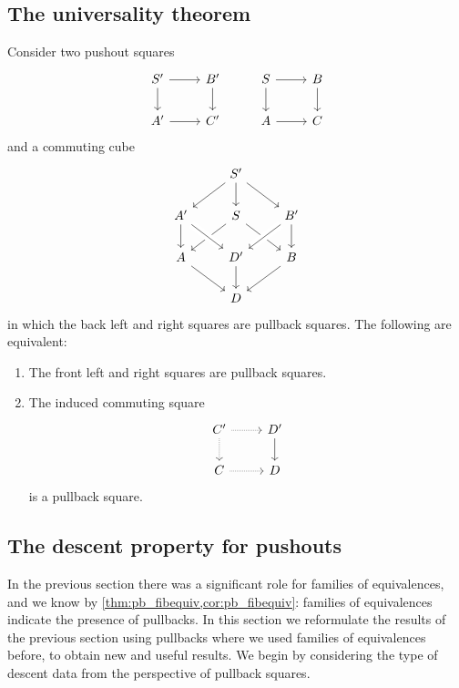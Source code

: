 \subsection{The universality theorem}
\begin{thm}
  Consider two pushout squares
  \begin{equation*}
    \begin{tikzcd}
      S' \arrow[r] \arrow[d] & B' \arrow[d] & S \arrow[r] \arrow[d] & B \arrow[d] \\
      A' \arrow[r] & C' & A \arrow[r] & C
    \end{tikzcd}
  \end{equation*}
  and a commuting cube
  \begin{equation*}
    \begin{tikzcd}
      & S' \arrow[dl] \arrow[d] \arrow[dr] \\
      A' \arrow[d] & S \arrow[dl] \arrow[dr] & B' \arrow[d] \arrow[dl,crossing over] \\
      A \arrow[dr] & D' \arrow[from=ul,crossing over] \arrow[d] & B \arrow[dl] \\
      & D
    \end{tikzcd}
  \end{equation*}
  in which the back left and right squares are pullback squares. The following are equivalent:
  \begin{enumerate}
  \item The front left and right squares are pullback squares.
  \item The induced commuting square
    \begin{equation*}
      \begin{tikzcd}
        C' \arrow[r,densely dotted] \arrow[d,densely dotted] & D' \arrow[d] \\
        C \arrow[r,densely dotted] & D
      \end{tikzcd}
    \end{equation*}
    is a pullback square.
  \end{enumerate}
\end{thm}


\subsection{The descent property for pushouts}

In the previous section there was a significant role for families of equivalences, and we know by \cref{thm:pb_fibequiv,cor:pb_fibequiv}: families of equivalences indicate the presence of pullbacks. In this section we reformulate the results of the previous section using pullbacks where we used families of equivalences before, to obtain new and useful results. We begin by considering the type of descent data from the perspective of pullback squares.

